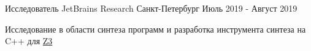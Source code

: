 

\begin{cventries}

  \cventry
    {Исследователь} %
    {JetBrains Research} %
    {Санкт-Петербург} %
    {Июль 2019 - Август 2019} %
    {
      \begin{cvitems} %
        \item {Исследование в области синтеза программ и разработка инструмента синтеза на C++ для \href{https://github.com/Z3Prover/z3}{Z3}}
      \end{cvitems}
    }


\end{cventries}
